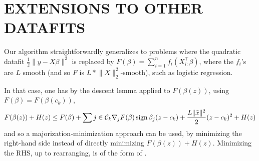 \section{EXTENSIONS TO OTHER DATAFITS}
\label{sec:other-datafits}

Our algorithm straightforwardly generalizes to problems where the quadratic datafit $\frac{1}{2} \lVert y - X \beta \rVert^2$ is replaced by $F(\beta) = \sum_{i = 1}^n f_i (X_{i:}^\top \beta)$, where the $f_i$'s are $L$ smooth (and so $F$ is $L * \lVert X \rVert_2^2$-smooth), such as logistic regression.

In that case, one has by the descent lemma applied to $F(\beta(z))$, using $F(\beta) = F(\beta(c_k))$,
\begin{equation}
  F(\beta(z)) + H(z) \leq F(\beta) + \sum{j \in \mathcal{C}_k} \nabla_j F(\beta) \operatorname{sign} \beta_j (z - c_k) + \frac{L \lVert \tilde x \rVert^2}{2} (z - c_k)^2 + H(z)
\end{equation}
and so a majorization-minimization approach can be used, by minimizing the right-hand side instead of directly minimizing $F(\beta(z)) + H(z)$.
Minimizing the RHS, up to rearranging, is of the form of .
